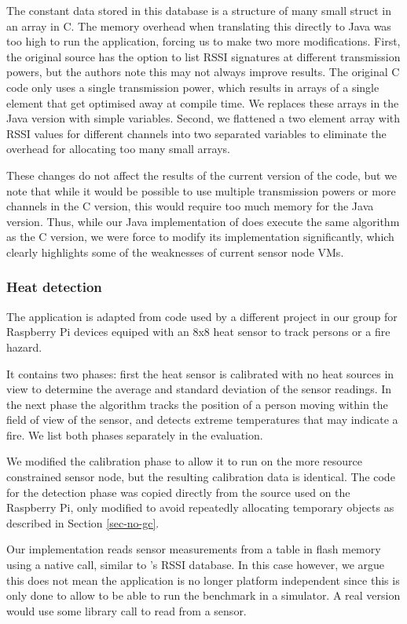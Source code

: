 The constant data stored in this database is a structure of many small struct in an array in C. The memory overhead when translating this directly to Java was too high to run the application, forcing us to make two more modifications. First, the original source has the option to list RSSI signatures at different transmission powers, but the authors note this may not always improve results. The original C code only uses a single transmission power, which results in arrays of a single element that get optimised away at compile time. We replaces these arrays in the Java version with simple variables. Second, we flattened a two element array with RSSI values for different channels into two separated variables to eliminate the overhead for allocating too many small arrays.

These changes do not affect the results of the current version of the code, but we note that while it would be possible to use multiple transmission powers or more channels in the C version, this would require too much memory for the Java version. Thus, while our Java implementation of  does execute the same algorithm as the C version, we were force to modify its implementation significantly, which clearly highlights some of the weaknesses of current sensor node VMs.


\subsubsection{Heat detection}
The  application is adapted from code used by a different project in our group for Raspberry Pi devices equiped with an 8x8 heat sensor to track persons or a fire hazard.

It contains two phases: first the heat sensor is calibrated with no heat sources in view to determine the average and standard deviation of the sensor readings. In the next phase the algorithm tracks the position of a person moving within the field of view of the sensor, and detects extreme temperatures that may indicate a fire. We list both phases separately in the evaluation.

We modified the calibration phase to allow it to run on the more resource constrained sensor node, but the resulting calibration data is identical. The code for the detection phase was copied directly from the source used on the Raspberry Pi, only modified to avoid repeatedly allocating temporary objects as described in Section \ref{sec-no-gc}.

Our implementation reads sensor measurements from a table in flash memory using a native call, similar to 's RSSI database. In this case however, we argue this does not mean the application is no longer platform independent since this is only done to allow to be able to run the benchmark in a simulator. A real version would use some library call to read from a sensor.


